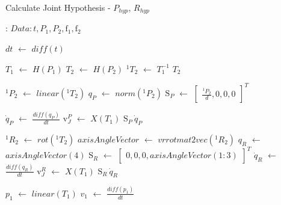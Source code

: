 \documentclass[12pt,a4paper]{report}
\begin{document}
\begin{algorithm}[H]
    \caption{Calculate Joint Hypothesis - $P_{hyp}$, $R_{hyp}$}
    \label{alg:joint estimation}
    \begin{algorithmic}[1]
        \REQUIRE: $Data : t, \textit{P}_1, \textit{P}_2, \mathrm{f}_1,\mathrm{f}_2$ 
  
        
           \STATE $dt$ $\leftarrow$ $diff(t)$
           
             
             \STATE $T_1$ $\leftarrow$ $H(P_1)$
             \STATE $T_2$ $\leftarrow$ $H(P_2)$
             \STATE $^1T_2$ $\leftarrow$ $T_1^{-1}$ $T_2$
            
             \STATE $^1P_2$ $\leftarrow$ $linear(^1T_2)$
             \STATE $q_P$ $\leftarrow$ $norm(^1P_2)$
             \STATE $\mathrm{S}_P$ $\leftarrow$ $\begin{bmatrix}
                                                   \frac{^1P_2}{d},0,0,0
                                                \end{bmatrix}^T$
                                                
             \STATE $\dot{q}_P$ $\leftarrow$ $\frac{diff(q_P)}{dt}$ \hspace*{4.5cm} 
             \STATE $\mathrm{v}_J^P$ $\leftarrow$ $X(T_1)$ $\mathrm{S}_P \ \dot{q}_P$ \hspace*{3.4cm}\hspace{-3.2cm}
             
             \STATE $^1{R}_2$ $\leftarrow$ $rot(^1T_2)$
             \STATE $axisAngleVector$ $\leftarrow$ $vrrotmat2vec(^1R_2)$
             \STATE $q_R$ $\leftarrow$ $axisAngleVector(4)$
             \STATE $\mathrm{S}_R$ $\leftarrow$ $\begin{bmatrix}
                                                  0,0,0,axisAngleVector(1:3)
                                                \end{bmatrix}^T$
             \STATE $\dot{q}_R$ $\leftarrow$ $\frac{diff(q_R)}{dt}$   
             \STATE $\mathrm{v}_J^R$ $\leftarrow$ $X(T_1)$ $\mathrm{S}_R \ \dot{q}_R$
             
             \STATE $p_1$ $\leftarrow$ $linear(T_1)$
             \STATE $v_{1}$ $\leftarrow$ $\frac{diff(p_1)}{dt}$
        

\end{algorithmic}
\end{algorithm}
\end{document}
